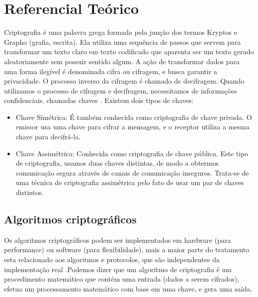 \documentclass[12pt]{article}
\begin{document}
\section{Referencial Teórico}

Criptografia é uma palavra grega formada pela junção dos termos Kryptos e Grapho (grafia, escrita). Ela utiliza uma sequência de passos que servem para transformar um texto claro em texto codificado que aparenta ser um texto gerado aleatoriamente sem possuir sentido algum. A ação de transformar dados para uma forma ilegível é denominada cifra ou cifragem, e busca garantir  a  privacidade. O processo inverso da cifragem é chamado de decifragem. Quando utilizamos o processo de cifragem e decifragem, necessitamos de informações confidenciais, chamadas chaves \cite{STALLINGS:14}. Existem dois tipos de chaves:

\begin{itemize}

\item Chave Simétrica: É também conhecida como criptografia de chave privada. O emissor usa uma chave para cifrar a mensagem, e o receptor utiliza a mesma chave para decifrá-la. 

\item Chave Assimétrica: Conhecida como  criptografia de  chave  pública. Este tipo de  criptografia,  usamos  duas  chaves  distintas,  de  modo  a  obtermos  comunicação  segura através de canais de comunicação inseguros. Trata-se de uma técnica de criptografia assimétrica pelo fato de usar um par de chaves distintos.

\end{itemize}


\subsection{Algoritmos criptográficos}

Os algoritmos criptográficos podem ser implementados em hardware (para performance) ou software (para flexibilidade), mais a maior parte do tratamento esta relacionado aos algoritmos e protocolos, que são independentes da implementação real \cite{TANENBAUM:03}.Podemos dizer que um algoritmo de criptografia é um procedimento matemático que contém uma entrada (dados a serem cifrados), efetua um processamento matemático com base em uma chave, e gera uma saída.
\end{document}
